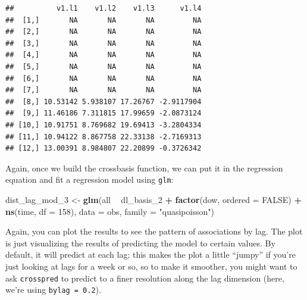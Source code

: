 \documentclass[
]{book}
\newenvironment{Shaded}{\begin{snugshade}}{\end{snugshade}}
\newcommand{\DataTypeTok}[1]{\textcolor[rgb]{0.13,0.29,0.53}{#1}}
\newcommand{\DecValTok}[1]{\textcolor[rgb]{0.00,0.00,0.81}{#1}}
\newcommand{\KeywordTok}[1]{\textcolor[rgb]{0.13,0.29,0.53}{\textbf{#1}}}
\newcommand{\NormalTok}[1]{#1}
\newcommand{\OperatorTok}[1]{\textcolor[rgb]{0.81,0.36,0.00}{\textbf{#1}}}
\newcommand{\OtherTok}[1]{\textcolor[rgb]{0.56,0.35,0.01}{#1}}
\newcommand{\StringTok}[1]{\textcolor[rgb]{0.31,0.60,0.02}{#1}}
\begin{document}
\begin{Shaded}
\end{Shaded}

\begin{verbatim}
##          v1.l1    v1.l2    v1.l3      v1.l4
##  [1,]       NA       NA       NA         NA
##  [2,]       NA       NA       NA         NA
##  [3,]       NA       NA       NA         NA
##  [4,]       NA       NA       NA         NA
##  [5,]       NA       NA       NA         NA
##  [6,]       NA       NA       NA         NA
##  [7,]       NA       NA       NA         NA
##  [8,] 10.53142 5.938107 17.26767 -2.9117904
##  [9,] 11.46186 7.311815 17.99659 -2.0873124
## [10,] 10.91751 8.769682 19.69413 -3.2804334
## [11,] 10.94122 8.867758 22.33138 -2.7169313
## [12,] 13.00391 8.984807 22.20899 -0.3726342
\end{verbatim}

Again, once we build the crossbasis function, we can put it in the regression equation and
fit a regression model using \texttt{glm}:

\begin{Shaded}
\begin{Highlighting}[]
\NormalTok{dist_lag_mod_}\DecValTok{3}\NormalTok{ <-}\StringTok{ }\KeywordTok{glm}\NormalTok{(all }\OperatorTok{~}\StringTok{ }\NormalTok{dl_basis_}\DecValTok{2} \OperatorTok{+}\StringTok{ }
\StringTok{                        }\KeywordTok{factor}\NormalTok{(dow, }\DataTypeTok{ordered =} \OtherTok{FALSE}\NormalTok{) }\OperatorTok{+}
\StringTok{                          }\KeywordTok{ns}\NormalTok{(time, }\DataTypeTok{df =} \DecValTok{158}\NormalTok{), }
                        \DataTypeTok{data =}\NormalTok{ obs, }\DataTypeTok{family =} \StringTok{"quasipoisson"}\NormalTok{)}
\end{Highlighting}
\end{Shaded}

Again, you can plot the results to see the pattern of associations by lag. The plot
is just visualizing the results of predicting the model to certain values. By default,
it will predict at each lag; this makes the plot a little ``jumpy'' if you're just looking
at lags for a week or so, so to make it smoother, you might want to ask \texttt{crosspred} to
predict to a finer resolution along the lag dimension (here, we're using \texttt{bylag\ =\ 0.2}).
\end{document}
